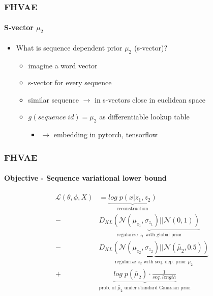 \documentclass[9pt]{beamer}
\begin{document}
\begin{frame}
\frametitle{FHVAE}
\framesubtitle{S-vector $\mu_2$}
\begin{itemize}
	\item What is sequence dependent prior $\mu_2$ (s-vector)?
	\begin{itemize}
		\item imagine a word vector 
		\item s-vector for every sequence
		\item similar sequence $\rightarrow$ in s-vectors close in euclidean space
		\item $g(sequence\;id) = \mu_2$ as differentiable lookup table
		\begin{itemize}
			\item $\rightarrow$ embedding in pytorch, tensorflow
		\end{itemize}
	\end{itemize}
\end{itemize}
\end{frame} 



\begin{frame}
\frametitle{FHVAE}
\framesubtitle{Objective - Sequence variational lower bound}
\begin{align*}
\mathcal{L}(\theta, \phi, X)& = %
\underbrace{log\;p(x|z_1, z_2)}_{\text{reconstruction}}\\%
-&\underbrace{D_{KL}(\mathcal{N}(\mu_{z_1}, \sigma_{z_1})||\mathcal{N}(0,1))}_{\text{regularize $z_1$ with global prior}}\\
-&\underbrace{D_{KL}(\mathcal{N}(\mu_{z_2}, \sigma_{z_2})||\mathcal{N}(\tilde{\mu_2},0.5))}_{\text{regularize $z_2$ with seq. dep. prior $\mu_2$}}\\
+&\underbrace{log\;p(\tilde{\mu_2}) \cdot \frac{1}{seq.\;length}}_{\text{prob. of $\tilde{\mu_2}$ under standard Gaussian prior}}
\end{align*}
\end{frame} 
\end{document}
